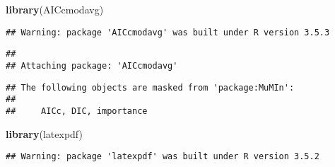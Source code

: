 \documentclass[]{article}
\newenvironment{Shaded}{\begin{snugshade}}{\end{snugshade}}
\newcommand{\KeywordTok}[1]{\textcolor[rgb]{0.13,0.29,0.53}{\textbf{#1}}}
\newcommand{\NormalTok}[1]{#1}
\begin{document}
\begin{Shaded}
\begin{Highlighting}[]
\KeywordTok{library}\NormalTok{(AICcmodavg)}
\end{Highlighting}
\end{Shaded}

\begin{verbatim}
## Warning: package 'AICcmodavg' was built under R version 3.5.3
\end{verbatim}

\begin{verbatim}
## 
## Attaching package: 'AICcmodavg'
\end{verbatim}

\begin{verbatim}
## The following objects are masked from 'package:MuMIn':
## 
##     AICc, DIC, importance
\end{verbatim}

\begin{Shaded}
\begin{Highlighting}[]
\KeywordTok{library}\NormalTok{(latexpdf)}
\end{Highlighting}
\end{Shaded}

\begin{verbatim}
## Warning: package 'latexpdf' was built under R version 3.5.2
\end{verbatim}
\end{document}
